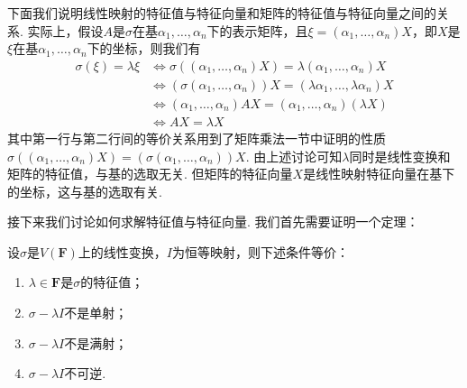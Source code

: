 \begin{solution}

\end{solution}

下面我们说明线性映射的特征值与特征向量和矩阵的特征值与特征向量之间的关系. 实际上，假设$A$是$\sigma$在基$\alpha_1,\ldots,\alpha_n$下的表示矩阵，且$\xi=(\alpha_1,\ldots,\alpha_n)X$，即$X$是$\xi$在基$\alpha_1,\ldots,\alpha_n$下的坐标，则我们有
\begin{align*}
    \sigma(\xi)=\lambda\xi & \iff \sigma((\alpha_1,\ldots,\alpha_n)X)=\lambda(\alpha_1,\ldots,\alpha_n)X        \\
                           & \iff (\sigma(\alpha_1,\ldots,\alpha_n))X=(\lambda\alpha_1,\ldots,\lambda\alpha_n)X \\
                           & \iff (\alpha_1,\ldots,\alpha_n)AX=(\alpha_1,\ldots,\alpha_n)(\lambda X)            \\
                           & \iff AX=\lambda X
\end{align*}
其中第一行与第二行间的等价关系用到了矩阵乘法一节中证明的性质$\sigma((\alpha_1,\ldots,\alpha_n)X)=(\sigma(\alpha_1,\ldots,\alpha_n))X$. 由上述讨论可知$\lambda$同时是线性变换和矩阵的特征值，与基的选取无关. 但矩阵的特征向量$X$是线性映射特征向量在基下的坐标，这与基的选取有关.

接下来我们讨论如何求解特征值与特征向量. 我们首先需要证明一个定理：
\begin{theorem}
    设$\sigma$是$V(\mathbf{F})$上的线性变换，$I$为恒等映射，则下述条件等价：
    \begin{enumerate}[label=(\arabic*)]
        \item \label{item:18:特征值定义:1}
              $\lambda\in\mathbf{F}$是$\sigma$的特征值；

        \item \label{item:18:特征值定义:2}
              $\sigma-\lambda I$不是单射；

        \item \label{item:18:特征值定义:3}
              $\sigma-\lambda I$不是满射；

        \item \label{item:18:特征值定义:4}
              $\sigma-\lambda I$不可逆.
    \end{enumerate}
\end{theorem}

